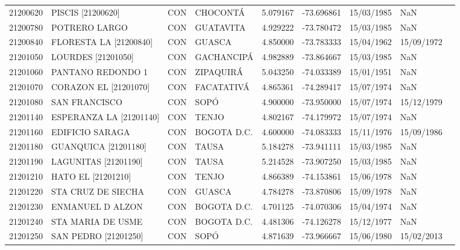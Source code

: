 \begin{landscape}
\begin{longtable}{lp{4cm}lp{3cm}lrrll}
   21200620 &           PISCIS [21200620] &  CON &          CHOCONTÁ &  5.079167 & -73.696861 &  15/03/1985 &         NaN \\
   21200780 &               POTRERO LARGO &  CON &         GUATAVITA &  4.929222 & -73.780472 &  15/03/1985 &         NaN \\
   21200840 &      FLORESTA LA [21200840] &  CON &            GUASCA &  4.850000 & -73.783333 &  15/04/1962 &  15/09/1972 \\
   21201050 &          LOURDES [21201050] &  CON &        GACHANCIPÁ &  4.982889 & -73.864667 &  15/03/1985 &         NaN \\
   21201060 &           PANTANO REDONDO 1 &  CON &         ZIPAQUIRÁ &  5.043250 & -74.033389 &  15/01/1951 &         NaN \\
   21201070 &       CORAZON EL [21201070] &  CON &        FACATATIVÁ &  4.865361 & -74.289417 &  15/07/1974 &         NaN \\
   21201080 &               SAN FRANCISCO &  CON &              SOPÓ &  4.900000 & -73.950000 &  15/07/1974 &  15/12/1979 \\
   21201140 &     ESPERANZA LA [21201140] &  CON &             TENJO &  4.802167 & -74.179972 &  15/07/1974 &         NaN \\
   21201160 &             EDIFICIO SARAGA &  CON &       BOGOTA D.C. &  4.600000 & -74.083333 &  15/11/1976 &  15/09/1986 \\
   21201180 &        GUANQUICA [21201180] &  CON &             TAUSA &  5.184278 & -73.941111 &  15/03/1985 &         NaN \\
   21201190 &        LAGUNITAS [21201190] &  CON &             TAUSA &  5.214528 & -73.907250 &  15/03/1985 &         NaN \\
   21201210 &        HATO EL   [21201210] &  CON &             TENJO &  4.866389 & -74.153861 &  15/06/1978 &         NaN \\
   21201220 &          STA CRUZ DE SIECHA &  CON &            GUASCA &  4.784278 & -73.870806 &  15/09/1978 &         NaN \\
   21201230 &            ENMANUEL D ALZON &  CON &       BOGOTA D.C. &  4.701125 & -74.070306 &  15/04/1974 &         NaN \\
   21201240 &           STA MARIA DE USME &  CON &       BOGOTA D.C. &  4.481306 & -74.126278 &  15/12/1977 &         NaN \\
   21201250 &        SAN PEDRO [21201250] &  CON &              SOPÓ &  4.871639 & -73.966667 &  15/06/1980 &  15/02/2013 \\

\end{longtable}
\end{landscape}
